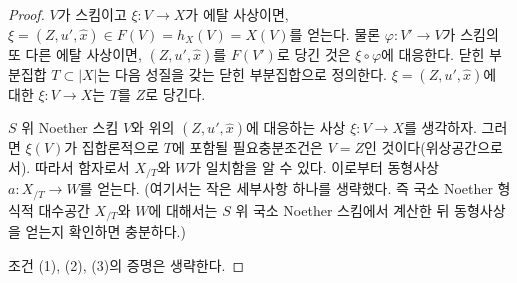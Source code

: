\begin{proof}
\medskip\noindent
$V$가 스킴이고 $\xi : V \to X$가 에탈 사상이면,
$\xi = (Z, u', \hat x) \in F(V) = h_X(V) = X(V)$를 얻는다.
물론 $\varphi : V' \to V$가 스킴의 또 다른 에탈 사상이면,
$(Z, u', \hat x)$를 $F(V')$로 당긴 것은 $\xi \circ \varphi$에 대응한다.
닫힌 부분집합 $T \subset |X|$는 다음 성질을 갖는 닫힌 부분집합으로
정의한다. $\xi = (Z, u', \hat x)$에 대한 $\xi : V \to X$는
$T$를 $Z$로 당긴다.

\medskip\noindent
$S$ 위 Noether 스킴 $V$와 위의 $(Z, u', \hat x)$에 대응하는 사상
$\xi : V \to X$를 생각하자.
그러면 $\xi(V)$가 집합론적으로 $T$에 포함될 필요충분조건은
$V = Z$인 것이다(위상공간으로서).
따라서 함자로서 $X_{/T}$와 $W$가 일치함을 알 수 있다.
이로부터 동형사상 $a : X_{/T} \to W$를 얻는다.
(여기서는 작은 세부사항 하나를 생략했다. 즉 국소 Noether 형식적 대수공간
$X_{/T}$와 $W$에 대해서는 $S$ 위 국소 Noether 스킴에서 계산한 뒤
동형사상을 얻는지 확인하면 충분하다.)

\medskip\noindent
조건 (1), (2), (3)의 증명은 생략한다.
\end{proof}

